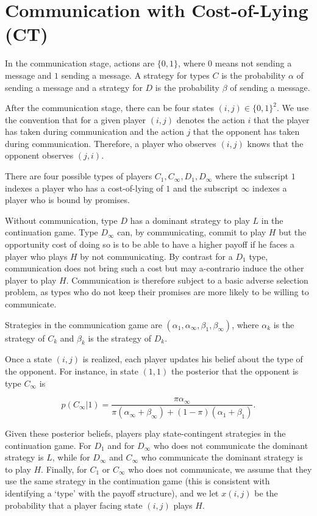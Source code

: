 \documentclass[12pt]{article}
\theoremstyle{definition}
\theoremstyle{remark}
\begin{document}
\section{Communication with Cost-of-Lying (CT)} \label{sec:communication_without_penalties}  In the communication stage, actions are $\{0,1\}$, where $0$ means not sending a message and $1$ sending a message. A strategy for types $C$ is the probability $\alpha$ of sending a message and a strategy for $D$ is the probability $\beta$ of sending a message.

After the communication stage, there can be four states $(i,j)\in\{0,1\}^2$. We use the convention that for a given player $(i,j)$ denotes the action $i$ that the player has taken during communication and the action $j$ that the opponent has taken during communication. Therefore, a player who observes $(i,j)$ knows that the opponent observes $(j,i)$.

There are four possible types of players $C_1,C_\infty,D_1,D_\infty$ where the subscript $1$ indexes a player who has a cost-of-lying of $1$ and the subscript $\infty$ indexes a player who is bound by promises.

Without communication, type $D$ has a dominant strategy to play $L$ in the continuation game. Type $D_\infty$ can, by communicating, commit to play $H$ but the opportunity cost of doing so is to be able to have a higher payoff if he faces a player who plays $H$ by not communicating. By contrast for a $D_1$ type, communication does not bring such a cost but may a-contrario induce the other player to play $H$. Communication is therefore subject to a basic adverse selection problem, as types who do not keep their promises are more likely to be willing to communicate.

Strategies in the communication game are $(\alpha_1,\alpha_\infty,\beta_1,\beta_\infty)$, where $\alpha_k$ is the strategy of $C_k$ and $\beta_k$ is the strategy of $D_k$.

Once a state $(i,j)$ is realized, each player updates his belief about the type of the opponent. For instance, in state $(1,1)$ the posterior that the opponent is type $C_\infty$ is

%
\[ p(C_\infty|1)=\frac{\pi \alpha_\infty}{\pi(\alpha_\infty+\beta_\infty)+(1-\pi)(\alpha_1+\beta_1)}. \]

%
Given these posterior beliefs, players play state-contingent strategies in the continuation game. For $D_1$ and for $D_\infty$ who does not communicate the dominant strategy is $L$, while for $D_\infty$ and $C_\infty$ who communicate the dominant strategy is to play $H$. Finally, for $C_1$ or $C_\infty$ who does not communicate, we assume that they use the same strategy in the continuation game (this is consistent with identifying a `type' with the payoff structure), and we let $x(i,j)$ be the probability that a player facing state $(i,j)$ plays $H$.
\end{document}
